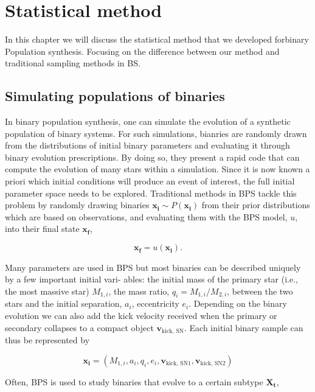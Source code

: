\chapter{Statistical method}
\label{ch:methods}
In this chapter we will discuss the statistical method that we developed forbinary Population synthesis. Focusing on the difference between our method and traditional sampling methods in BS. 


\section{Simulating populations of binaries}
In binary population synthesis, one can simulate the evolution of a synthetic population of binary systems. 
For such simulations, bianries are randomly drawn from the distributions of initial binary parameters and evaluating it through binary evolution prescriptions. By doing so, they present a rapid
code that can compute the evolution of many stars within
a simulation.
Since it is now known a priori which initial conditions will produce an event of interest, the full initial parameter space needs to be explored. Traditional methods in BPS tackle this problem by randomly drawing binaries $\mathbf{x_i} \sim P(\mathbf{x_i})$ from their prior distributions which are based on observations, and evaluating them with the BPS model, $u$,  into their final state $\mathbf{x_f}$, 

\begin{equation}
	\mathbf{x_f} = u(\mathbf{x_i}). 
\end{equation}  

Many parameters are used in BPS but most binaries can be described uniquely by a few important initial vari-
ables: the initial mass of the primary star (i.e., the most massive star) $M_{1,i}$, the mass ratio, $q_i = M_{1,i} / M_{2,i}$, between
the two stars and the initial separation, $a_i$, eccentricity $e_i$. Depending on the binary evolution we can also add the kick velocity received when the primary or secondary collapses to a compact object $\mathbf{v}_{\text{kick, SN}}$. Each initial binary sample can thus be represented by 

\begin{equation}
	\mathbf{x_i} = (M_{1,i}, a_i, q_i, e_i, \mathbf{v}_{\text{kick, SN1}}, \mathbf{v}_{\text{kick, SN2}} )
\end{equation}

Often, BPS is used to study binaries that evolve to a certain subtype $\mathbf{X_t}$,  

